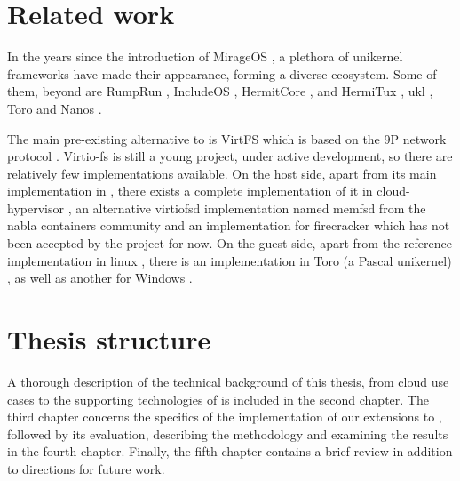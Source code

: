 \section{Related work}

In the years since the introduction of MirageOS \cite{mirageos}, a plethora of
unikernel frameworks have made their appearance, forming a diverse ecosystem.
Some of them, beyond \osv{} are RumpRun \cite{rumprun}, IncludeOS
\cite{includeos}, HermitCore \cite{hermitcore}, and HermiTux \cite{hermitux},
ukl \cite{ukl}, Toro \cite{toro} and Nanos \cite{nanos}.

The main pre-existing alternative to \viofs{} is VirtFS \cite{virtfs} which is
based on the 9P network protocol \cite{9p}. Virtio-fs is still a young project,
under active development, so there are relatively few implementations available.
On the host side, apart from its main implementation in \qemu{}
\cite{virtiofs:qemu}, there exists a complete implementation of it in
cloud-hypervisor \cite{cloud-hypervisor}, an alternative virtiofsd
implementation named memfsd from the nabla containers community \cite{memfsd}
and an implementation for firecracker \cite{firecracker} which has not been
accepted by the project for now. On the guest side, apart from the reference
implementation in linux \cite{virtiofs:linux}, there is an implementation
in Toro (a Pascal unikernel) \cite{toro}, as well as another for Windows
\cite{virtio-windows}.

\section{Thesis structure}

A thorough description of the technical background of this thesis, from cloud
use cases to the supporting technologies of \viofs{} is included in the second
chapter. The third chapter concerns the specifics of the implementation of our
extensions to \osv{}, followed by its evaluation, describing the methodology and
examining the results in the fourth chapter. Finally, the fifth chapter contains
a brief review in addition to directions for future work.
